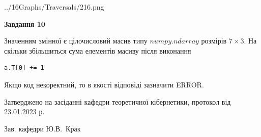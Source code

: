\documentclass[12pt, ukrainian]{article}
\begin{document}
{\begin {large}
\begin{center}
	{../16Graphs/Traversals/216.png}
\end{center}\par
\newpage

{\begin {center}\textbf{Завдання 10}\end {center}}\par
Значенням змінної  є цілочисловий масив типу $numpy.ndarray$ розмірів $7{\times}3$. На скільки збільшиться сума елементів масиву  після виконання
\begin{verbatim}
a.T[0] += 1
\end{verbatim}


Якщо код некоректний, то в якості відповіді зазначити ERROR.\par
\newpage


\end {large}
}
{\smallskip \begin {small} Затверджено на засіданні кафедри теоретичної кібернетики, протокол  від   23.01.2023 р.\par\smallskip\smallskip
{\parbox {6.5 cm}{Зав. кафедри \dotfill Ю.В.~Крак}} \end{small}}
\end{document}
